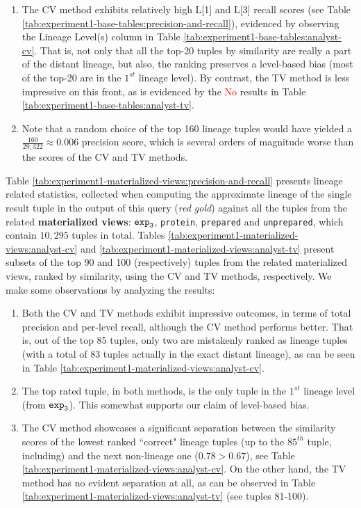 \begin{experiment-withrun}
\begin{enumerate}
    \item The CV method exhibits relatively high L[1] and L[3] recall scores (see Table \ref{tab:experiment1-base-tables:precision-and-recall}), evidenced by observing the Lineage Level(s) column in Table \ref{tab:experiment1-base-tables:analyst-cv}. That is, not only that all the top-20 tuples by similarity are really a part of the distant lineage, but also, the ranking preserves a level-based bias (most of the top-20 are in the $1^{st}$ lineage level). By contrast, the TV method is less impressive on this front, as is evidenced by the \textcolor{Red}{No} results in Table \ref{tab:experiment1-base-tables:analyst-tv}.
    \item Note that a random choice of the top 160 lineage tuples would have yielded a $\frac{160}{29,322} \approx 0.006$ precision score, which is several orders of magnitude worse than the scores of the CV and TV methods. 
\end{enumerate}



Table \ref{tab:experiment1-materialized-views:precision-and-recall} presents lineage related statistics, collected when computing the approximate lineage of the single result tuple in the output of this query (\textit{red gold}) against all the tuples from the related \textbf{materialized views}: $\texttt{exp}\sb\texttt{3}$, \texttt{protein}, \texttt{prepared} and \texttt{unprepared}, which contain $10,295$ tuples in total. Tables \ref{tab:experiment1-materialized-views:analyst-cv} and \ref{tab:experiment1-materialized-views:analyst-tv} present subsets of the top 90 and 100 (respectively) tuples from the related materialized views, ranked by similarity, using the CV and TV methods, respectively. We make some observations by analyzing the results:
\begin{enumerate}
    \item Both the CV and TV methods exhibit impressive outcomes, in terms of total precision and per-level recall, although the CV method performs better. That is, out of the top 85 tuples, only two are mistakenly ranked as lineage tuples (with a total of 83 tuples actually in the exact distant lineage), as can be seen in Table \ref{tab:experiment1-materialized-views:analyst-cv}.
    \item The top rated tuple, in both methods, is the only tuple in the $1^{st}$ lineage level (from $\texttt{exp}\sb\texttt{3}$). This somewhat supports our claim of level-based bias.
    \item The CV method showcases a significant separation between the similarity scores of the lowest ranked ``correct" lineage tuples (up to the $85^{th}$ tuple, including) and the next non-lineage one ($0.78 > 0.67$), see Table \ref{tab:experiment1-materialized-views:analyst-cv}. On the other hand, the TV method has no evident separation at all, as can be observed in Table \ref{tab:experiment1-materialized-views:analyst-tv} (see tuples 81-100).
\end{enumerate}


\end{experiment-withrun}
